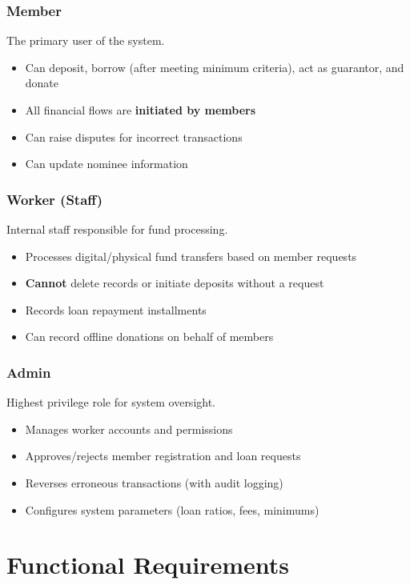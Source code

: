 \documentclass[11pt,a4paper]{article}
\begin{document}
\subsubsection{Member}
The primary user of the system.
\begin{itemize}
    \item Can deposit, borrow (after meeting minimum criteria), act as guarantor, and donate
    \item All financial flows are \textbf{initiated by members}
    \item Can raise disputes for incorrect transactions
    \item Can update nominee information
\end{itemize}

\subsubsection{Worker (Staff)}
Internal staff responsible for fund processing.
\begin{itemize}
    \item Processes digital/physical fund transfers based on member requests
    \item \textbf{Cannot} delete records or initiate deposits without a request
    \item Records loan repayment installments
    \item Can record offline donations on behalf of members
\end{itemize}

\subsubsection{Admin}
Highest privilege role for system oversight.
\begin{itemize}
    \item Manages worker accounts and permissions
    \item Approves/rejects member registration and loan requests
    \item Reverses erroneous transactions (with audit logging)
    \item Configures system parameters (loan ratios, fees, minimums)
\end{itemize}

\section{Functional Requirements}
\end{document}
